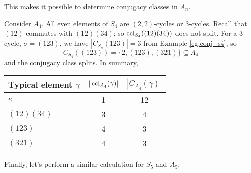 \documentclass[10pt, a4paper, twoside]{report}
\begin{document}
This makes it possible to determine conjugacy classes in \(A_n\).
\begin{example}
    Consider \(A_4\). All even elements of \(S_4\) are \((2,2)\)-cycles or \(3\)-cycles. Recall that \((12)\) commutes with \((12)(34)\); so \(\operatorname{ccl}_{S_4}((12)(34))\) does not split. For a \(3\)-cycle, \(\sigma=(123)\), we have \(|C_{S_n}(123)|=3\) from Example \ref{eg:conj_s4}, so 
    \[C_{S_4}\left((123)\right)=\{2,(123),(321)\}\subseteq A_4\]
    and the conjugacy class splits. In summary,
    \begin{table}[H]
        \centering
        \begin{tabularx}{0.6\textwidth}{Xcc}
            \toprule
            Typical element \(\gamma\) & \(|\operatorname{ccl}_{A_4}(\gamma)|\) & \(|C_{A_4}(\gamma)|\) \\
            \midrule
            \(e\) & 1 & 12 \\
            \((12)(34)\) & 3 & 4 \\
            \((123)\) & 4 & 3 \\
            \((321)\) & 4 & 3 \\
            \bottomrule 
        \end{tabularx}
    \end{table}
\end{example}
Finally, let's perform a similar calculation for \(S_5\) and \(A_5\).
\end{document}

